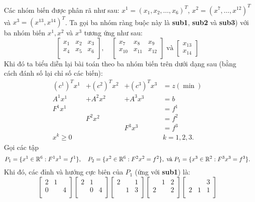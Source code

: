Các nhóm biến được phân rã như sau: $x^1 = (x_1, x_2,\dots, x_6)^T$, $x^2=(x^7,\dots, x^{12})^T$ và $x^3=(x^{13}, x^{14})^T$. Ta gọi ba nhóm ràng buộc này là  {\bf sub1}, {\bf sub2} và {\bf sub3}) với ba nhóm biến $x^1, x^2$ và $x^3$ tương ứng như sau:
\begin{displaymath}
\left[ \begin{array}{lll}
x_{1} & x_{2} & x_3 \\
x_4 & x_5 & x_6 \\
\end{array} \right]
,\quad
\left[ \begin{array}{lll}
x_7 & x_8 & x_9 \\
x_{10} & x_{11} & x_{12} \\
\end{array} \right]
\;\text{và}\;
\left[ \begin{array}{l}
x_{13}\\
x_{14}
\end{array} \right]
\end{displaymath}
Khi đó ta biểu diễn lại bài toán theo ba nhóm biến trên dưới dạng sau (bằng cách đánh số lại chỉ số các biến):
\begin{equation}
\begin{array}{llll}
(c^1)^Tx^1 &+ (c^2)^Tx^2 &+ (c^3)^Tx^3 &= z(\min) \\
A^{1}x^1 &+ A^{2}x^2 &+ A^{3}x^3 &= b\\
F^{1} x^1 & & &= f^1\\
&F^{2} x^2 & &= f^2\\
& &F^{3} x^3 &= f^3\\
x^k \geq 0 & & & k = 1, 2, 3.
\end{array}
\end{equation}
Gọi các tập 
$$
P_1 = \{x^1\in{\mathbb R}^6: F^1x^1 = f^1\},\quad P_2 = \{x^2\in{\mathbb R}^6: F^2x^2 = f^2\},\; \text{và}\; P_1 = \{x^3\in{\mathbb R}^2: F^3x^3 = f^3\}.
$$
Khi đó, các đỉnh và hướng cực biên của $P_1$ (ứng với {\bf sub1}) là:
\begin{displaymath}
\left[ \begin{array}{ccc}
2 & 1 &  \\
0 &  & 4 \\
\end{array} \right]
\left[ \begin{array}{ccc}
2 & 1 &  \\
 & 0 & 4 \\
\end{array} \right]
\left[ \begin{array}{ccc}
2 & & 1 \\
 & 1 & 3 \\
\end{array} \right]
\left[ \begin{array}{ccc}
 & 1 & 2 \\
2 &  & 2 \\
\end{array} \right]
\left[ \begin{array}{ccc}
 &  & 3 \\
2 & 1 & 1 \\
\end{array} \right]
\end{displaymath}
